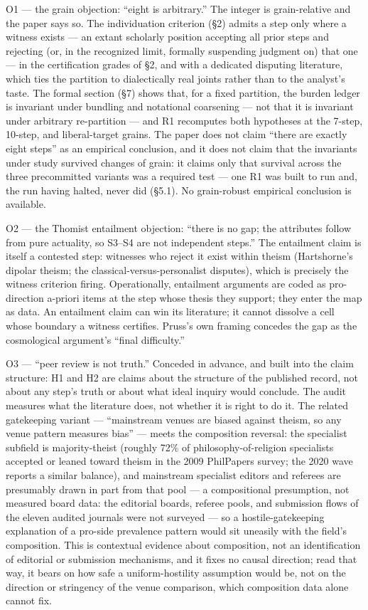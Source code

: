 O1 --- the grain objection: ``eight is arbitrary.'' The integer is grain-relative and the paper says so. The individuation criterion (\S{}2) admits a step only where a witness exists --- an extant scholarly position accepting all prior steps and rejecting (or, in the recognized limit, formally suspending judgment on) that one --- in the certification grades of \S{}2, and with a dedicated disputing literature, which ties the partition to dialectically real joints rather than to the analyst's taste. The formal section (\S{}7) shows that, for a fixed partition, the burden ledger is invariant under bundling and notational coarsening --- not that it is invariant under arbitrary re-partition --- and R1 recomputes both hypotheses at the 7-step, 10-step, and liberal-target grains. The paper does not claim ``there are exactly eight steps'' as an empirical conclusion, and it does not claim that the invariants under study survived changes of grain: it claims only that survival across the three precommitted variants was a required test --- one R1 was built to run and, the run having halted, never did (\S{}5.1). No grain-robust empirical conclusion is available.

O2 --- the Thomist entailment objection: ``there is no gap; the attributes follow from pure actuality, so S3--S4 are not independent steps.'' The entailment claim is itself a contested step: witnesses who reject it exist within theism (Hartshorne's dipolar theism; the classical-versus-personalist disputes), which is precisely the witness criterion firing. Operationally, entailment arguments are coded as pro-direction a-priori items at the step whose thesis they support; they enter the map as data. An entailment claim can win its literature; it cannot dissolve a cell whose boundary a witness certifies. Pruss's own framing concedes the gap as the cosmological argument's ``final difficulty.''

O3 --- ``peer review is not truth.'' Conceded in advance, and built into the claim structure: H1 and H2 are claims about the structure of the published record, not about any step's truth or about what ideal inquiry would conclude. The audit measures what the literature does, not whether it is right to do it. The related gatekeeping variant --- ``mainstream venues are biased against theism, so any venue pattern measures bias'' --- meets the composition reversal: the specialist subfield is majority-theist (roughly 72\% of philosophy-of-religion specialists accepted or leaned toward theism in the 2009 PhilPapers survey; the 2020 wave reports a similar balance), and mainstream specialist editors and referees are presumably drawn in part from that pool --- a compositional presumption, not measured board data: the editorial boards, referee pools, and submission flows of the eleven audited journals were not surveyed --- so a hostile-gatekeeping explanation of a pro-side prevalence pattern would sit uneasily with the field's composition. This is contextual evidence about composition, not an identification of editorial or submission mechanisms, and it fixes no causal direction; read that way, it bears on how safe a uniform-hostility assumption would be, not on the direction or stringency of the venue comparison, which composition data alone cannot fix.

